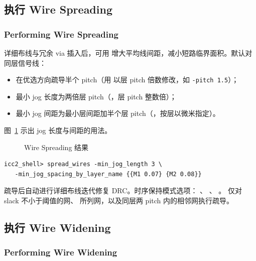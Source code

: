 \subsection{执行 Wire Spreading}
\subsubsection*{Performing Wire Spreading}

详细布线与冗余 via 插入后，可用  增大平均线间距，减小短路临界面积。默认对同层信号线：
\begin{itemize}
  \item 在优选方向疏导半个 pitch（用  以层 pitch 倍数修改，如 \texttt{-pitch 1.5}）；
  \item 最小 jog 长度为两倍层 pitch（，层 pitch 整数倍）；
  \item 最小 jog 间距为最小层间距加半个层 pitch（，按层以微米指定）。
\end{itemize}

图~\ref{fig:wire-spreading} 示出 jog 长度与间距的用法。

\begin{figure}[htbp]
\centering
{}
\caption{Wire Spreading 结果}
\label{fig:wire-spreading}
\end{figure}

\begin{lstlisting}
icc2_shell> spread_wires -min_jog_length 3 \
   -min_jog_spacing_by_layer_name {{M1 0.07} {M2 0.08}}
\end{lstlisting}

疏导后自动进行详细布线迭代修复 DRC。时序保持模式选项：
、
、
。
仅对 slack 不小于阈值的网、 所列网，以及同层两 pitch 内的相邻网执行疏导。

\subsection{执行 Wire Widening}
\subsubsection*{Performing Wire Widening}

